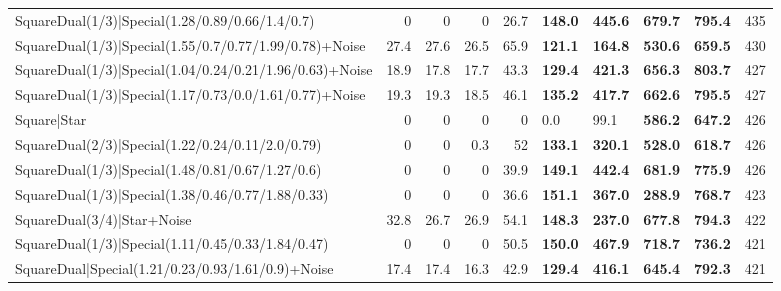 \begin{tabular}{lrrrrllllr}
 SquareDual(1/3)|Special(1.28/0.89/0.66/1.4/0.7)         &          0   &          0   &          0   &            26.7 & \textbf{148.0} & \textbf{445.6} & \textbf{679.7} & \textbf{795.4}  &          435 \\
 SquareDual(1/3)|Special(1.55/0.7/0.77/1.99/0.78)+Noise  &         27.4 &         27.6 &         26.5 &            65.9 & \textbf{121.1} & \textbf{164.8} & \textbf{530.6} & \textbf{659.5}  &          430 \\
 SquareDual(1/3)|Special(1.04/0.24/0.21/1.96/0.63)+Noise &         18.9 &         17.8 &         17.7 &            43.3 & \textbf{129.4} & \textbf{421.3} & \textbf{656.3} & \textbf{803.7}  &          427 \\
 SquareDual(1/3)|Special(1.17/0.73/0.0/1.61/0.77)+Noise  &         19.3 &         19.3 &         18.5 &            46.1 & \textbf{135.2} & \textbf{417.7} & \textbf{662.6} & \textbf{795.5}  &          427 \\
 Square|Star                                             &          0   &          0   &          0   &             0   & 0.0            & 99.1           & \textbf{586.2} & \textbf{647.2}  &          426 \\
 SquareDual(2/3)|Special(1.22/0.24/0.11/2.0/0.79)        &          0   &          0   &          0.3 &            52   & \textbf{133.1} & \textbf{320.1} & \textbf{528.0} & \textbf{618.7}  &          426 \\
 SquareDual(1/3)|Special(1.48/0.81/0.67/1.27/0.6)        &          0   &          0   &          0   &            39.9 & \textbf{149.1} & \textbf{442.4} & \textbf{681.9} & \textbf{775.9}  &          426 \\
 SquareDual(1/3)|Special(1.38/0.46/0.77/1.88/0.33)       &          0   &          0   &          0   &            36.6 & \textbf{151.1} & \textbf{367.0} & \textbf{288.9} & \textbf{768.7}  &          423 \\
 SquareDual(3/4)|Star+Noise                              &         32.8 &         26.7 &         26.9 &            54.1 & \textbf{148.3} & \textbf{237.0} & \textbf{677.8} & \textbf{794.3}  &          422 \\
 SquareDual(1/3)|Special(1.11/0.45/0.33/1.84/0.47)       &          0   &          0   &          0   &            50.5 & \textbf{150.0} & \textbf{467.9} & \textbf{718.7} & \textbf{736.2}  &          421 \\
 SquareDual|Special(1.21/0.23/0.93/1.61/0.9)+Noise       &         17.4 &         17.4 &         16.3 &            42.9 & \textbf{129.4} & \textbf{416.1} & \textbf{645.4} & \textbf{792.3}  &          421 \\

\end{tabular}
